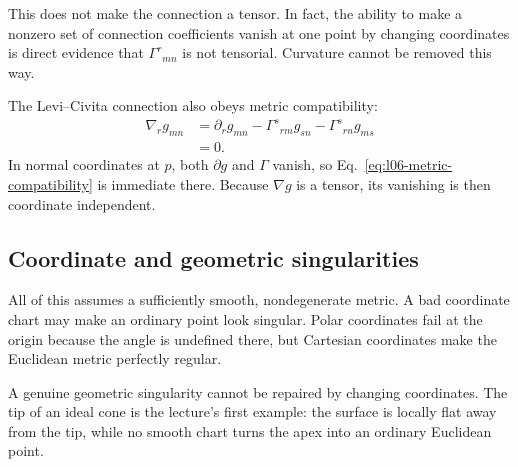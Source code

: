 This does not make the connection a tensor. In fact, the ability to make a
nonzero set of connection coefficients vanish at one point by changing
coordinates is direct evidence that \(\Gamma^r{}_{mn}\) is not tensorial.
Curvature cannot be removed this way.

The Levi--Civita connection also obeys metric compatibility:
\begin{align}
  \nabla_r g_{mn}
  &=
  \partial_r g_{mn}
  -
  \Gamma^s{}_{rm}g_{sn}
  -
  \Gamma^s{}_{rn}g_{ms}
  \nonumber\\
  &=0.
  \label{eq:l06-metric-compatibility}
\end{align}
In normal coordinates at \(p\), both \(\partial g\) and \(\Gamma\) vanish,
so Eq.~\eqref{eq:l06-metric-compatibility} is immediate there. Because
\(\nabla g\) is a tensor, its vanishing is then coordinate independent.

\begin{classroomqa}
\end{classroomqa}

\subsection{Coordinate and geometric singularities}

All of this assumes a sufficiently smooth, nondegenerate metric. A bad
coordinate chart may make an ordinary point look singular. Polar
coordinates fail at the origin because the angle is undefined there, but
Cartesian coordinates make the Euclidean metric perfectly regular.

A genuine geometric singularity cannot be repaired by changing
coordinates. The tip of an ideal cone is the lecture's first example: the
surface is locally flat away from the tip, while no smooth chart turns the
apex into an ordinary Euclidean point.

